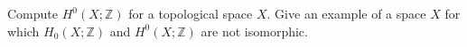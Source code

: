 Compute $H^0(X; \mathbb{Z})$ for a topological space $X$. Give an example of
a space $X$ for which $H_0(X; \mathbb{Z})$ and $H^0(X; \mathbb{Z})$ are not
isomorphic.
